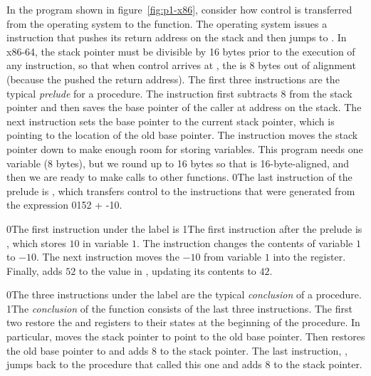 \documentclass[7x10]{TimesAPriori_MIT}%
\def\racketEd{0}
\def\pythonEd{1}
\def\edition{0}
\newcommand{\racket}[1]{{\if\edition\racketEd{#1}\fi}}
\newcommand{\python}[1]{{\if\edition\pythonEd #1\fi}}
\numberwithin{theorem}{chapter}
\numberwithin{definition}{chapter}
\numberwithin{equation}{chapter}
\begin{document}
In the program shown in figure~\ref{fig:p1-x86}, consider how control
is transferred from the operating system to the  function.
The operating system issues a  instruction that
pushes its return address on the stack and then jumps to
. In x86-64, the stack pointer  must be divisible
by 16 bytes prior to the execution of any  instruction, so
that when control arrives at , the  is 8 bytes
out of alignment (because the  pushed the return address).
The first three instructions are the typical
\emph{prelude} for a procedure.  The
instruction  first subtracts $8$ from the stack
pointer  and then saves the base pointer of the caller at
address  on the stack. The next instruction  sets the base pointer to the current stack pointer,
which is pointing to the location of the old base pointer. The
instruction  moves the stack pointer down to
make enough room for storing variables.  This program needs one
variable ($8$ bytes), but we round up to 16 bytes so that  is
16-byte-aligned, and then we are ready to make calls to other functions.
\racket{The last instruction of the prelude is , which
  transfers control to the instructions that were generated from the
  expression \racket{\code{(+ 52 (- 10))}}\python{52 + -10}.}

\racket{The first instruction under the  label is}
%
\python{The first instruction after the prelude is}
%
, which stores $10$ in variable $1$.
%
The instruction  changes the contents of variable
$1$ to $-10$.
%
The next instruction moves the $-10$ from variable $1$ into the
 register.  Finally,  adds $52$ to
the value in , updating its contents to $42$.

\racket{The three instructions under the label  are the
  typical \emph{conclusion} of a procedure.}
%
\python{The \emph{conclusion}\index{subject}{conclusion} of the
  \code{main} function consists of the last three instructions.}
%
The first two restore the  and  registers to their
states at the beginning of the procedure. In particular,
 moves the stack pointer to point to the
old base pointer. Then  restores the old base pointer
to  and adds $8$ to the stack pointer.  The last instruction,
, jumps back to the procedure that called this one and adds
$8$ to the stack pointer.
\end{document}
